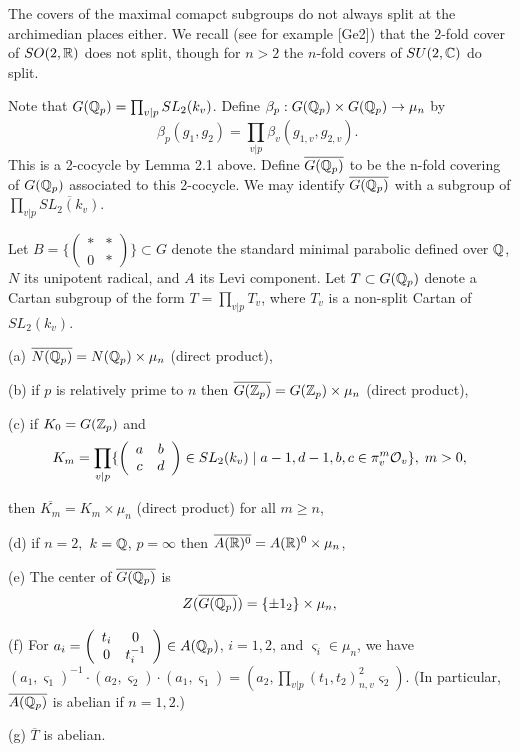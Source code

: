 The covers of the maximal comapct subgroups do not always split
at the archimedian places either.
We recall (see for example [Ge2]) that the $2$-fold cover of 
$SO(2,{\Bbb R})$ does not split, though for $n>2$ the $n$-fold
covers of $SU(2,{\Bbb C})$ do split.

Note that $G({\Bbb{Q}}_p)=\prod_{v|p}SL_2(k_v)$. Define 
$\beta _p:G({\Bbb{Q}}_p)\times G({\Bbb{Q}}_p)\rightarrow \mu _n$ by 
\[
\beta _p(g_1,g_2)=\prod_{v|p}\beta _v(g_{1,v},g_{2,v})\text{. } 
\]
This is a 2-cocycle by Lemma 2.1 above. Define
$\overline{G({\Bbb{Q}}_p)}$ to be
the n-fold covering of $G({\Bbb{Q}}_p)$ associated to this 2-cocycle. We may
identify $\overline{G({\Bbb{Q}}_p)}$ with a subgroup of 
$\prod_{v|p}\overline{SL_2(k_v)}$.

Let $B=\{\left( 
\begin{array}{cc}
\ast & * \\ 
0 & *
\end{array}
\right) \}\subset G$ denote the standard minimal parabolic
defined over ${\Bbb{Q}}$, $N$ its unipotent radical, and
$A$ its Levi component. Let
$T\subset G({\Bbb{Q}}_p)$ denote a Cartan subgroup of the form
$T=\prod_{v|p}T_v$, where $T_v$ is a non-split
Cartan of $SL_2(k_v)$.

\begin{lemma}
(a) $\overline{N({\Bbb{Q}}_p)}=N({\Bbb{Q}}_p)\times \mu _n$ (direct product),

(b) if $p$ is relatively prime to $n$
then $\overline{G({\Bbb{Z}}_p)}=G({\Bbb{Z}}_p)\times \mu _n$ (direct product),

(c) if $K_0=G({\Bbb{Z}}_p)$ and 
\[
K_m=\prod_{v|p}\{\left( 
\begin{array}{cc}
a & b \\ 
c & d
\end{array}
\right) \in SL_2(k_v)\;|\;a-1,d-1,b,c\in \pi _v^m{\cal{O}}_v\},\;m>0,
\]

then $\overline{K_m}=K_m\times \mu _n$ (direct product) for all $m\geq n$,

(d) if $n=2,$ $k={\Bbb{Q}}$, $p=\infty $ then 
$\overline{A({\Bbb R})^0}=A({\Bbb R})^0 \times \mu _n$,

(e) The center of $\overline{G({\Bbb{Q}}_p)}$ is 
\[
Z(\overline{G({\Bbb{Q}}_p)})=
\{\pm 1_2\}\times \mu _n,
\]

(f) For $a_i=\left( 
\begin{array}{cc}
t_i & 0 \\ 
0 & t_i^{-1}
\end{array}
\right) \in A({\Bbb{Q}}_p)$, $i=1,2$, and $\varsigma _i\in \mu _n$, we have $%
(a_1,\varsigma _1)^{-1}\cdot (a_2,\varsigma _2)\cdot (a_1,\varsigma
_1)=(a_2,\prod_{v|p}(t_1,t_2)_{n,v}^2\varsigma _2)$.
(In particular, $\overline{A({\Bbb{Q}}_p)}$ is abelian if $n=1,2$.)

(g) $\overline{T}$ is abelian.
\end{lemma}

